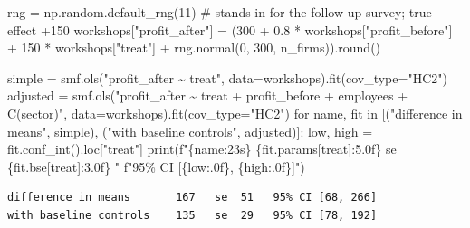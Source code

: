 \documentclass[
  letterpaper,
  10pt,
  twoside,
  openright,
  numbers=noenddot,
  chapterprefix=true]{scrbook}
\newenvironment{Shaded}{}{}
\newcommand{\BuiltInTok}[1]{\textcolor[rgb]{0.84,0.23,0.29}{#1}}
\newcommand{\CommentTok}[1]{\textcolor[rgb]{0.42,0.45,0.49}{#1}}
\newcommand{\ControlFlowTok}[1]{\textcolor[rgb]{0.84,0.23,0.29}{#1}}
\newcommand{\DecValTok}[1]{\textcolor[rgb]{0.00,0.36,0.77}{#1}}
\newcommand{\FloatTok}[1]{\textcolor[rgb]{0.00,0.36,0.77}{#1}}
\newcommand{\KeywordTok}[1]{\textcolor[rgb]{0.84,0.23,0.29}{#1}}
\newcommand{\NormalTok}[1]{\textcolor[rgb]{0.14,0.16,0.18}{#1}}
\newcommand{\OperatorTok}[1]{\textcolor[rgb]{0.14,0.16,0.18}{#1}}
\newcommand{\SpecialCharTok}[1]{\textcolor[rgb]{0.00,0.36,0.77}{#1}}
\newcommand{\SpecialStringTok}[1]{\textcolor[rgb]{0.01,0.18,0.38}{#1}}
\newcommand{\StringTok}[1]{\textcolor[rgb]{0.01,0.18,0.38}{#1}}
\begin{document}
\label{check-trial-estimate}
\begin{Shaded}
\begin{Highlighting}[]
\NormalTok{rng }\OperatorTok{=}\NormalTok{ np.random.default\_rng(}\DecValTok{11}\NormalTok{)                }\CommentTok{\# stands in for the follow{-}up survey; true effect +150}
\NormalTok{workshops[}\StringTok{"profit\_after"}\NormalTok{] }\OperatorTok{=}\NormalTok{ (}\DecValTok{300} \OperatorTok{+} \FloatTok{0.8} \OperatorTok{*}\NormalTok{ workshops[}\StringTok{"profit\_before"}\NormalTok{] }\OperatorTok{+} \DecValTok{150} \OperatorTok{*}\NormalTok{ workshops[}\StringTok{"treat"}\NormalTok{]}
                             \OperatorTok{+}\NormalTok{ rng.normal(}\DecValTok{0}\NormalTok{, }\DecValTok{300}\NormalTok{, n\_firms)).}\BuiltInTok{round}\NormalTok{()}

\NormalTok{simple }\OperatorTok{=}\NormalTok{ smf.ols(}\StringTok{"profit\_after \textasciitilde{} treat"}\NormalTok{, data}\OperatorTok{=}\NormalTok{workshops).fit(cov\_type}\OperatorTok{=}\StringTok{"HC2"}\NormalTok{)}
\NormalTok{adjusted }\OperatorTok{=}\NormalTok{ smf.ols(}\StringTok{"profit\_after \textasciitilde{} treat + profit\_before + employees + C(sector)"}\NormalTok{,}
\NormalTok{                   data}\OperatorTok{=}\NormalTok{workshops).fit(cov\_type}\OperatorTok{=}\StringTok{"HC2"}\NormalTok{)}
\ControlFlowTok{for}\NormalTok{ name, fit }\KeywordTok{in}\NormalTok{ [(}\StringTok{"difference in means"}\NormalTok{, simple), (}\StringTok{"with baseline controls"}\NormalTok{, adjusted)]:}
\NormalTok{    low, high }\OperatorTok{=}\NormalTok{ fit.conf\_int().loc[}\StringTok{"treat"}\NormalTok{]}
    \BuiltInTok{print}\NormalTok{(}\SpecialStringTok{f"}\SpecialCharTok{\{}\NormalTok{name}\SpecialCharTok{:23s\}}\SpecialStringTok{ }\SpecialCharTok{\{}\NormalTok{fit}\SpecialCharTok{.}\NormalTok{params[}\StringTok{\textquotesingle{}treat\textquotesingle{}}\NormalTok{]}\SpecialCharTok{:5.0f\}}\SpecialStringTok{   se }\SpecialCharTok{\{}\NormalTok{fit}\SpecialCharTok{.}\NormalTok{bse[}\StringTok{\textquotesingle{}treat\textquotesingle{}}\NormalTok{]}\SpecialCharTok{:3.0f\}}\SpecialStringTok{   "}
          \SpecialStringTok{f"95\% CI [}\SpecialCharTok{\{}\NormalTok{low}\SpecialCharTok{:.0f\}}\SpecialStringTok{, }\SpecialCharTok{\{}\NormalTok{high}\SpecialCharTok{:.0f\}}\SpecialStringTok{]"}\NormalTok{)}
\end{Highlighting}
\end{Shaded}

\begin{verbatim}
difference in means       167   se  51   95% CI [68, 266]
with baseline controls    135   se  29   95% CI [78, 192]
\end{verbatim}
\end{document}
